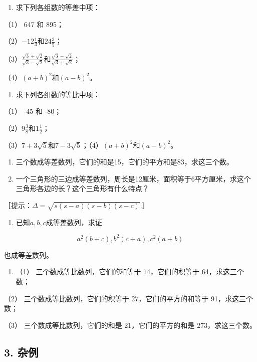 \begin{enumerate}
\item
  求下列各组数的等差中项：
\end{enumerate}

（1） 647 和 895；

（2）\(-12\frac{1}{3}\)和\(24\frac{3}{5}\)；

（3）\(\frac{\sqrt{3} + \sqrt{2}}{\sqrt{3} - \sqrt{2}}\)和\(\frac{\sqrt{3} - \sqrt{2}}{\sqrt{3} + \sqrt{2}}\)；

（4）\((a + b)^{2}\)和\((a - b)^{2}\)。

\begin{enumerate}[start=2]
\item
  求下列各组数的等比中项：
\end{enumerate}

（1） -45 和 -80；

（2）\(9\frac{3}{8}\)和\(1\frac{1}{2}\)；

（3）\(7 + 3\sqrt{5}\)和\(7 - 3\sqrt{5}\)；（4）\((a + b)^2\)和\((a - b)^2\)。

\begin{enumerate}[start=3]
\item
  三个数成等差数列，它们的和是15，它们的平方和是83，求这三个数。
\item
  一个三角形的三边成等差数列，周长是12厘米，面积等于6平方厘米，求这个三角形各边的长？这个三角形有什么特点？
\end{enumerate}

［提示：\(\Delta = \sqrt{s(s - a)(s - b)(s - c)}.\)］

\begin{enumerate}[start=5]
\item
  已知\(a, b, c\)成等差数列，求证
\end{enumerate}

\[
a^{2} (b + c), b^{2} (c + a), c^{2} (a + b)
\]

也成等差数列。

\begin{enumerate}[start=6]
\item
  （1） 三个数成等比数列，它们的和等于 14，它们的积等于 64，求这三个数；
\end{enumerate}

（2） 三个数成等比数列，它们的积等于 27，它们的平方的和等于
91，求这三个数；

（3） 三个数成等比数列，它们的和是 21，它们的平方的和是
273，求这三个数。

\subsection{3. 杂例}

